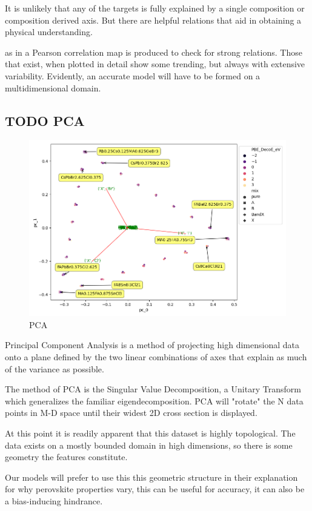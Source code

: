 \documentclass[twoside, twocolumn, 9pt, draft]{article}
\begin{document}
It is unlikely that any of the targets is fully explained by a single
composition or composition derived axis. But there are helpful relations
that aid in obtaining a physical understanding.

as in a Pearson correlation map is produced to check for strong
relations. Those that exist, when plotted in detail show some trending,
but always with extensive variability. Evidently, an accurate model will
have to be formed on a multidimensional domain.

\subsection*{{\bfseries\sffamily TODO} PCA}
\label{sec:org65849cf}
\begin{figure}
\centering
\includegraphics[width=.9\linewidth]{comp_ratio_projection_annot.png}
\caption{\label{fig:pca} PCA}
\end{figure}

Principal Component Analysis is a method of projecting high dimensional
data onto a plane defined by the two linear combinations of axes that
explain as much of the variance as possible.

The method of PCA is the Singular Value Decomposition, a Unitary
Transform which generalizes the familiar eigendecomposition. PCA will
"rotate" the N data points in M-D space until their widest 2D cross
section is displayed.

At this point it is readily apparent that this dataset is highly
topological. The data exists on a mostly bounded domain in high
dimensions, so there is some geometry the features constitute.

Our models will prefer to use this this geometric structure in their
explanation for why perovskite properties vary, this can be useful for
accuracy, it can also be a bias-inducing hindrance.
\end{document}
